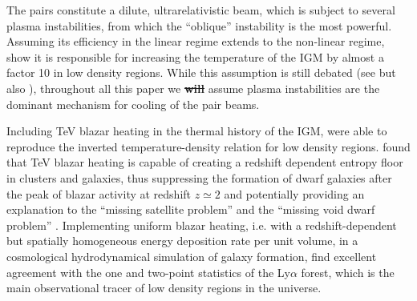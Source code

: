 \documentclass[numberedappendix]{emulateapj}
\newcommand\ALc[1]{{\color{red} \bf #1}} %
\begin{document}

The pairs constitute a dilute, ultrarelativistic beam, which is subject to several plasma instabilities, from which the ``oblique'' instability \citep{PhysRevE.70.046401} is the most powerful. Assuming its efficiency in the linear regime extends to the non-linear regime, \citet{2012ApJ...752...23C} show it is responsible for increasing the temperature of the IGM by almost a factor 10 in low density regions. While this assumption is still debated (see \citet{2013ApJ...770...54M,2014ApJ...787...49S} but also \citet{2013ApJ...777...49S,2012ApJ...758..102S,2014arXiv1410.3797C}), throughout all this paper we \ALc{\sout{will}} assume plasma instabilities are the dominant mechanism for cooling of the pair beams.

Including TeV blazar heating in the thermal history of the IGM, \citet{2012ApJ...752...23C} were able to reproduce the inverted temperature-density relation for low density regions. \citet{2012ApJ...752...24P} found that TeV blazar heating  is capable of creating a redshift dependent entropy floor in clusters and galaxies, thus suppressing the formation of dwarf galaxies after the peak of blazar activity at redshift $z\simeq2$ and potentially providing an explanation to the ``missing satellite problem'' and the ``missing void dwarf problem'' \citep{2010AdAst2010E...8K}. Implementing uniform blazar heating, i.e. with a redshift-dependent but spatially homogeneous energy deposition rate per unit volume, in a cosmological hydrodynamical simulation of galaxy formation, \citet{2012MNRAS.423..149P} find excellent agreement with the one and two-point statistics of the Ly$\alpha$ forest, which is the main observational tracer of low density regions in the universe.
\end{document}
